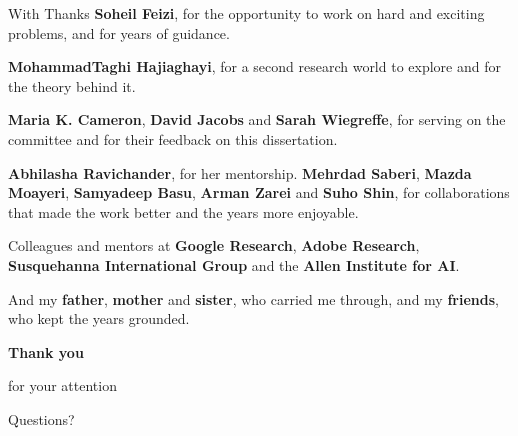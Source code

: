 \documentclass[aspectratio=169]{beamer}
\begin{document}
\begin{frame}{With Thanks}
    \footnotesize
    \setlength{\parskip}{0.55em}
    \textbf{Soheil Feizi}, for the opportunity to work on hard and exciting problems,
    and for years of guidance.\par

    \textbf{MohammadTaghi Hajiaghayi}, for a second research world to explore and for
    the theory behind it.\par

    \textbf{Maria K. Cameron}, \textbf{David Jacobs} and \textbf{Sarah Wiegreffe},
    for serving on the committee and for their feedback on this dissertation.\par

    \textbf{Abhilasha Ravichander}, for her mentorship. \textbf{Mehrdad Saberi},
    \textbf{Mazda Moayeri}, \textbf{Samyadeep Basu}, \textbf{Arman Zarei} and \textbf{Suho Shin}, for
    collaborations that made the work better and the years more enjoyable.\par

    Colleagues and mentors at \textbf{Google Research}, \textbf{Adobe Research},
    \textbf{Susquehanna International Group} and the \textbf{Allen Institute for AI}.\par

    And my \textbf{father}, \textbf{mother} and \textbf{sister}, who carried me
    through, and my \textbf{friends}, who kept the years grounded.\par

\end{frame}

\begin{frame}
    \vfill
    \centering
    {\Huge\color{themecolor}\textbf{Thank you}}

    \vspace{1.2em}
    {\Large\color{gray!35!black} for your attention}

    \vspace{1.6em}
    {\Large\color{gray!35!black} Questions?}
    \vfill
\end{frame}
\end{document}
